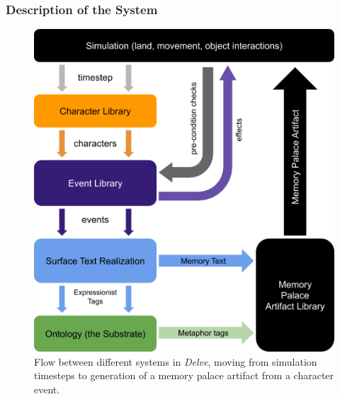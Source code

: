 \subsubsection{Description of the System}\label{subsubsec:delve-description}


\begin{figure}
    \centering
    \includegraphics[width=\textwidth]{figures/4-Delve/delve-diagram.png}
    \caption{Flow between different systems in \textit{Delve}, moving from simulation timesteps to generation of a memory palace artifact from a character event.}
    \label{fig:delve-diagram}
\end{figure}


